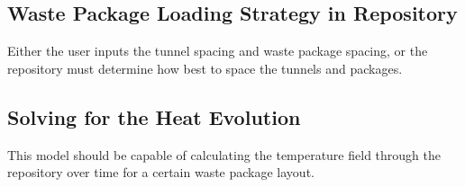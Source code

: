 \documentclass[letterpaper]{article}
\begin{document}
\subsection{Waste Package Loading Strategy in Repository}

Either the user inputs the tunnel spacing and waste package spacing, or the 
repository must determine how best to space the tunnels and packages.

\subsection{Solving for the Heat Evolution}

This model should be capable of calculating the temperature field through the 
repository over time for a certain waste package layout. 


\pagebreak


\end{document}
